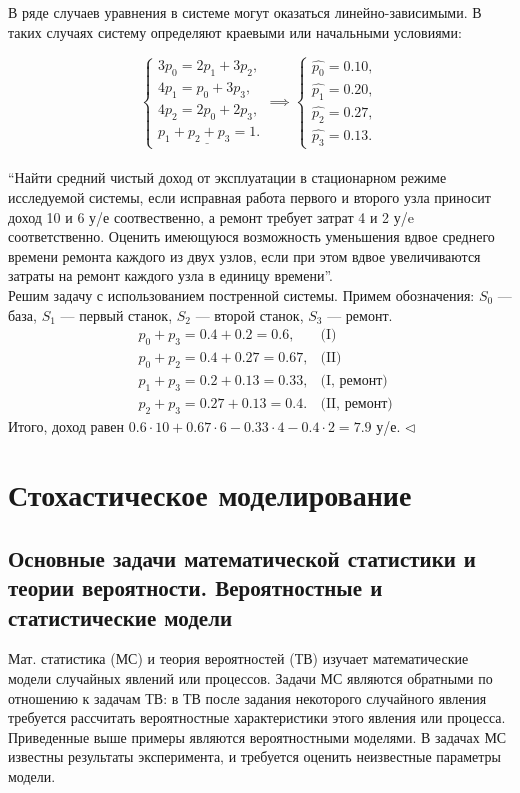 \documentclass[12pt]{article}
\begin{document}
В ряде случаев уравнения в системе могут оказаться линейно-зависимыми. В таких случаях систему определяют краевыми или начальными условиями:

\[
\begin{cases}
    3 p_0 = 2p_1 + 3p_2,\\
    4p_1 = p_0 + 3p_3,\\
    4p_2 = 2p_0 + 2p_3,\\
    \underline{p_1 + p_2 + p_3 = 1}.
\end{cases}
\implies
\begin{cases}
    \hat{p_0} = 0.10,\\
    \hat{p_1} = 0.20,\\
    \hat{p_2} = 0.27,\\
    \hat{p_3} = 0.13.
\end{cases}
\]\\

\enquote{Найти средний чистый доход от эксплуатации в стационарном режиме исследуемой системы, если исправная работа первого и второго узла приносит доход 10 и 6 у/е соотвественно, а ремонт требует затрат 4 и 2 у/e соответственно. Оценить имеющуюся возможность уменьшения вдвое среднего времени ремонта каждого из двух узлов, если при этом вдвое увеличиваются затраты на ремонт каждого узла в единицу времени}.\\

Решим задачу с использованием постренной системы. Примем обозначения: $S_0$ --- база, $S_1$ --- первый станок, $S_2$ --- второй станок, $S_3$ --- ремонт.
\begin{align*}
    &p_0 + p_3 = 0.4 + 0.2 = 0.6,   &\text{(I)}\\
    &p_0 + p_2 = 0.4 + 0.27 = 0.67, &\text{(II)}\\
    &p_1 + p_3 = 0.2 + 0.13 = 0.33, &\text{(I, ремонт)}\\
    &p_2 + p_3 = 0.27 + 0.13 = 0.4. &\text{(II, ремонт)}
\end{align*}
Итого, доход равен $0.6 \cdot 10 + 0.67 \cdot 6 - 0.33 \cdot 4 - 0.4 \cdot 2 = 7.9$ у/е. $\triangleleft$

\newpage
\section{Стохастическое моделирование}
\subsection{Основные задачи математической статистики и теории вероятности. Вероятностные и статистические модели}
Мат. статистика (МС) и теория вероятностей (ТВ) изучает математические модели случайных явлений или процессов. Задачи МС являются обратными по отношению к задачам ТВ: в ТВ после задания некоторого случайного явления требуется рассчитать вероятностные характеристики этого явления или процесса. Приведенные выше примеры являются вероятностными моделями. В задачах МС известны результаты эксперимента, и требуется оценить неизвестные параметры модели.
\end{document}
